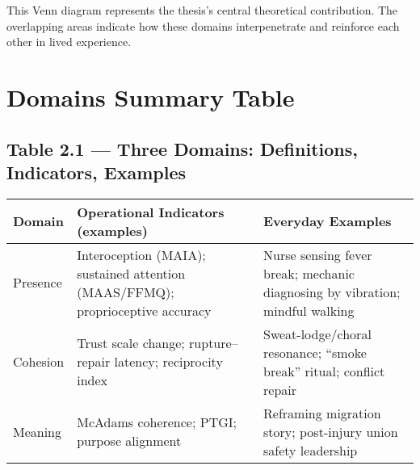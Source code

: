 \documentclass[
  a4paper,
]{report}
\begin{document}
\begin{tcolorbox}[enhanced jigsaw, toprule=.15mm, rightrule=.15mm, breakable, opacitybacktitle=0.6, colframe=quarto-callout-tip-color-frame, colback=white, titlerule=0mm, arc=.35mm, leftrule=.75mm, opacityback=0, colbacktitle=quarto-callout-tip-color!10!white, bottomrule=.15mm, coltitle=black, toptitle=1mm, bottomtitle=1mm, title=\textcolor{quarto-callout-tip-color}{\faLightbulb}\hspace{0.5em}{Tip}, left=2mm]

This Venn diagram represents the thesis's central theoretical
contribution. The overlapping areas indicate how these domains
interpenetrate and reinforce each other in lived experience.

\end{tcolorbox}

\section{Domains Summary Table}\label{domains-summary-table}

\subsection{Table 2.1 --- Three Domains: Definitions, Indicators,
Examples}\label{table-2.1-three-domains-definitions-indicators-examples}

\begin{longtable}[]{@{}
  >{\raggedright\arraybackslash}p{}
  >{\raggedright\arraybackslash}p{}
  >{\raggedright\arraybackslash}p{}@{}}
\toprule\noalign{}
\begin{minipage}[b]{\linewidth}\raggedright
\textbf{Domain}
\end{minipage} & \begin{minipage}[b]{\linewidth}\raggedright
\textbf{Operational Indicators (examples)}
\end{minipage} & \begin{minipage}[b]{\linewidth}\raggedright
\textbf{Everyday Examples}
\end{minipage} \\
\midrule\noalign{}
\endhead
\bottomrule\noalign{}
\endlastfoot
Presence & Interoception (MAIA); sustained attention (MAAS/FFMQ);
proprioceptive accuracy & Nurse sensing fever break; mechanic diagnosing
by vibration; mindful walking \\
Cohesion & Trust scale change; rupture--repair latency; reciprocity
index & Sweat-lodge/choral resonance; ``smoke break'' ritual; conflict
repair \\
Meaning & McAdams coherence; PTGI; purpose alignment & Reframing
migration story; post-injury union safety leadership \\
\end{longtable}
\end{document}
